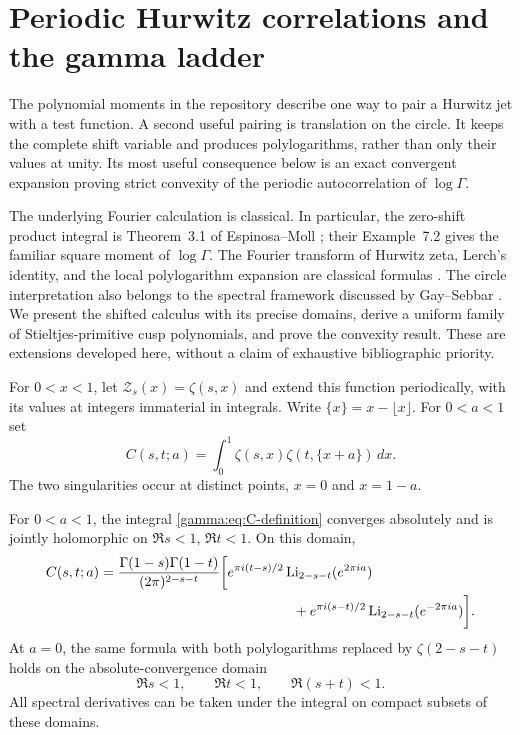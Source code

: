 \section{Periodic Hurwitz correlations and the gamma ladder}
\label{gamma:sec:correlations}

The polynomial moments in the repository describe one way to pair a
Hurwitz jet with a test function. A second useful pairing is translation
on the circle. It keeps the complete shift variable and produces
polylogarithms, rather than only their values at unity. Its most useful
consequence below is an exact convergent expansion proving strict
convexity of the periodic autocorrelation of $\log\Gamma$.

The underlying Fourier calculation is classical. In particular, the
zero-shift product integral is Theorem~3.1 of Espinosa--Moll
\cite{gamma:EspinosaMoll2002}; their Example~7.2 gives the familiar square
moment of $\log\Gamma$. The Fourier transform of Hurwitz zeta, Lerch's
identity, and the local polylogarithm expansion are classical formulas
\cite{gamma:DLMF}. The circle interpretation also belongs to the
spectral framework discussed by Gay--Sebbar \cite{gamma:GaySebbar2024}.
We present the shifted calculus with its precise domains, derive a
uniform family of Stieltjes-primitive cusp polynomials, and prove the
convexity result. These are extensions developed here, without a claim
of exhaustive bibliographic priority.

For $0<x<1$, let $\mathcal Z_s(x)=\zeta(s,x)$ and extend this function
periodically, with its values at integers immaterial in integrals.
Write $\{x\}=x-\lfloor x\rfloor$. For $0<a<1$ set
\begin{equation}
 C(s,t;a)=\int_0^1\zeta(s,x)\zeta(t,\{x+a\})\,dx.
 \label{gamma:eq:C-definition}
\end{equation}
The two singularities occur at distinct points, $x=0$ and $x=1-a$.

\begin{theorem}
\label{gamma:thm:shifted-product}
For $0<a<1$, the integral \eqref{gamma:eq:C-definition} converges
absolutely and is jointly holomorphic on
$\Re s<1$, $\Re t<1$. On this domain,
\begin{align}
 C(s,t;a)
 ={}&\frac{\Gamma(1-s)\Gamma(1-t)}{(2\pi)^{2-s-t}}
 \biggl[
 e^{\pi i(t-s)/2}\Li_{2-s-t}(e^{2\pi ia})\notag\\
 &\hspace{44mm}
 +e^{\pi i(s-t)/2}\Li_{2-s-t}(e^{-2\pi ia})
 \biggr].
 \label{gamma:eq:shifted-product}
\end{align}
At $a=0$, the same formula with both polylogarithms replaced by
$\zeta(2-s-t)$ holds on the absolute-convergence domain
\begin{equation}
 \Re s<1,\qquad \Re t<1,\qquad \Re(s+t)<1.
 \label{gamma:eq:zero-shift-domain}
\end{equation}
All spectral derivatives can be taken under the integral on compact
subsets of these domains.
\end{theorem}

